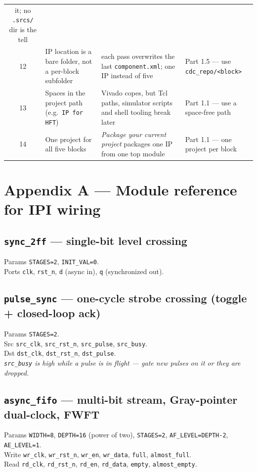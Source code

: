 \documentclass[10pt,a4paper]{article}
\newcommand{\code}[1]{\texttt{\small #1}}
\begin{document}
\begin{center}
\begin{tabular}{@{}cp{5.1cm}p{4.3cm}p{4.0cm}@{}}
it; no \code{.srcs/} dir is the tell \\
12 & IP location is a bare folder, not a per-block subfolder & each pass overwrites
the last \code{component.xml}; one IP instead of five & Part 1.5 --- use
\code{cdc\_repo/<block>} \\
13 & Spaces in the project path (e.g.\ \code{IP for HFT}) & Vivado copes, but Tcl
paths, simulator scripts and shell tooling break later & Part 1.1 --- use a
space-free path \\
14 & One project for all five blocks & \emph{Package your current project} packages
one IP from one top module & Part 1.1 --- one project per block \\
\bottomrule
\end{tabular}
\end{center}

\section*{Appendix A --- Module reference for IPI wiring}

\subsection*{\code{sync\_2ff} --- single-bit level crossing}
Params \code{STAGES=2}, \code{INIT\_VAL=0}. \\
Ports \code{clk}, \code{rst\_n}, \code{d} (async in), \code{q} (synchronized out).

\subsection*{\code{pulse\_sync} --- one-cycle strobe crossing (toggle + closed-loop ack)}
Params \code{STAGES=2}. \\
Src \code{src\_clk}, \code{src\_rst\_n}, \code{src\_pulse}, \code{src\_busy}. \\
Dst \code{dst\_clk}, \code{dst\_rst\_n}, \code{dst\_pulse}. \\
\emph{\code{src\_busy} is high while a pulse is in flight --- gate new pulses on it
or they are dropped.}

\subsection*{\code{async\_fifo} --- multi-bit stream, Gray-pointer dual-clock, FWFT}
Params \code{WIDTH=8}, \code{DEPTH=16} (power of two), \code{STAGES=2},
\code{AF\_LEVEL=DEPTH-2}, \code{AE\_LEVEL=1}. \\
Write \code{wr\_clk}, \code{wr\_rst\_n}, \code{wr\_en}, \code{wr\_data},
\code{full}, \code{almost\_full}. \\
Read \code{rd\_clk}, \code{rd\_rst\_n}, \code{rd\_en}, \code{rd\_data},
\code{empty}, \code{almost\_empty}.
\end{document}
